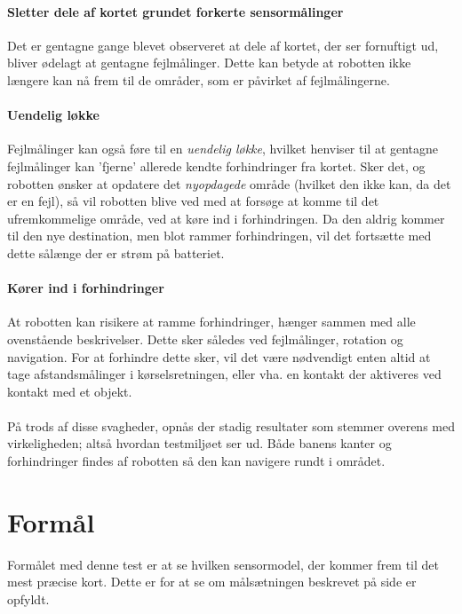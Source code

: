 \paragraph{Sletter dele af kortet grundet forkerte sensormålinger}
Det er gentagne gange blevet observeret at dele af kortet, der ser fornuftigt ud, bliver ødelagt at gentagne fejlmålinger.
Dette kan betyde at robotten ikke længere kan nå frem til de områder, som er påvirket af fejlmålingerne.

\paragraph{Uendelig løkke}
Fejlmålinger kan også føre til en \textit{uendelig løkke}, hvilket henviser til at gentagne fejlmålinger kan 'fjerne' allerede kendte forhindringer fra kortet.
Sker det, og robotten ønsker at opdatere det \textit{nyopdagede} område (hvilket den ikke kan, da det er en fejl), så vil robotten blive ved med at forsøge at komme til det ufremkommelige område, ved at køre ind i forhindringen.
Da den aldrig kommer til den nye destination, men blot rammer forhindringen, vil det fortsætte med dette sålænge der er strøm på batteriet.

\paragraph{Kører ind i forhindringer}
At robotten kan risikere at ramme forhindringer, hænger sammen med alle ovenstående beskrivelser.
Dette sker således ved fejlmålinger, rotation og navigation.
For at forhindre dette sker, vil det være nødvendigt enten altid at tage afstandsmålinger i kørselsretningen, eller vha. en kontakt der aktiveres ved kontakt med et objekt.

\paragraph{}

På trods af disse svagheder, opnås der stadig resultater som stemmer overens med virkeligheden; altså hvordan testmiljøet ser ud.
Både banens kanter og forhindringer findes af robotten så den kan navigere rundt i området.

\section{Formål}
Formålet med denne test er at se hvilken sensormodel, der kommer frem til det mest præcise kort.
Dette er for at se om målsætningen beskrevet på side \pageref{problem:maalsaetning} er opfyldt.

